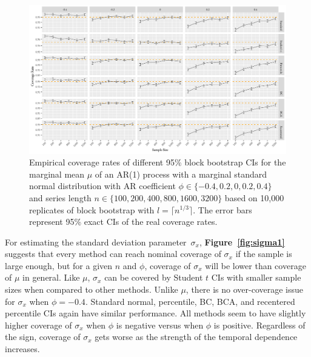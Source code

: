 \documentclass[10pt]{article}
\begin{document}
\begin{figure}[tbp]
  \centering
  \includegraphics[width=\textwidth]{figures/plot_norm_mu_1_cp}
  \caption{Empirical coverage rates of different 95\% block bootstrap CIs 
    for
    the marginal mean $\mu$ of an AR(1) process with a marginal standard 
    normal distribution with AR coefficient
    $\phi \in \{-0.4, 0.2, 0, 0.2, 0.4\}$ and series length
    $n \in \{100, 200, 400, 800, 1600, 3200\}$ based on 10,000 replicates of
    block bootstrap with $l = \lceil n^{1/3} \rceil$. The
    error bars represent 95\% exact CIs of the real coverage rates.}
  \label{fig:norm_mu_1_cp}
\end{figure}

For estimating the standard deviation parameter~$\sigma_x$,
\textbf{Figure~\ref{fig:sigma1}} suggests that every method can reach nominal 
coverage of $\sigma_x$ if the sample is large enough, but for a given $n$ and 
$\phi$, coverage of $\sigma_x$ will be lower than coverage of $\mu$ in general.
Like $\mu$, $\sigma_x$ can be covered by Student $t$ CIs with smaller sample 
sizes when compared to other methods. Unlike $\mu$, there is no over-coverage 
issue for $\sigma_x$ when $\phi = -0.4$. Standard normal, percentile, BC, BCA, and 
recentered percentile CIs again have similar performance. All methods seem to 
have slightly higher coverage of $\sigma_x$ when $\phi$ is negative versus when 
$\phi$ is positive. Regardless of the sign, coverage of $\sigma_x$ gets worse as 
the strength of the temporal dependence increases.
\end{document}
